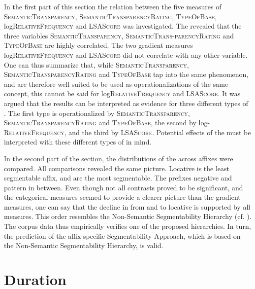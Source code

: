 In the first part of this section the relation between the five measures of  \textsc{SemanticTransparency}, \textsc{SemanticTransparencyRating}, \textsc{TypeOfBase}, log\textsc{RelativeFrequency} and \textsc{LSAScore} was investigated. The  revealed that the three variables \textsc{SemanticTransparency}, \textsc{SemanticTrans-parencyRating} and \textsc{TypeOfBase} are highly correlated. The two gradient measures  log\textsc{RelativeFrequency} and \textsc{LSAScore}  did not correlate with any other  variable.  
One can thus summarize that, while  \textsc{SemanticTransparency}, \textsc{SemanticTransparencyRating} and \textsc{TypeOfBase} tap into the same phenomenon, and are therefore well suited to be used as operationalizations of the same concept, this cannot be said for 
log\textsc{RelativeFrequency} and \textsc{LSAScore}. 
It was argued that the results can be interpreted as evidence for three different types of . The first type is operationalized by  \textsc{SemanticTransparency}, \textsc{SemanticTransparencyRating} and \textsc{TypeOfBase}, the second by log-\textsc{RelativeFrequency}, and the third by \textsc{LSAScore}. Potential effects of the  must be interpreted with these different types of  in mind. 

 In the second part of the section, the distributions of the  across affixes were compared. All comparisons revealed the same picture. Locative  is the least segmentable affix,  and  are the most segmentable. The prefixes negative  and  pattern in between. 
 Even though not all contrasts proved to be significant, and the categorical measures seemed to provide a clearer picture than the gradient measures, one can say that the decline in  from  and  to locative  is supported by all measures. 
 This order resembles the Non-Semantic Segmentability Hierarchy (cf.  ). The corpus data thus empirically verifies one of the proposed  hierarchies. In turn, the  prediction of the affix-specific Segmentability Approach, which is based on the Non-Semantic Segmentability Hierarchy, is valid. 

\section{Duration}


